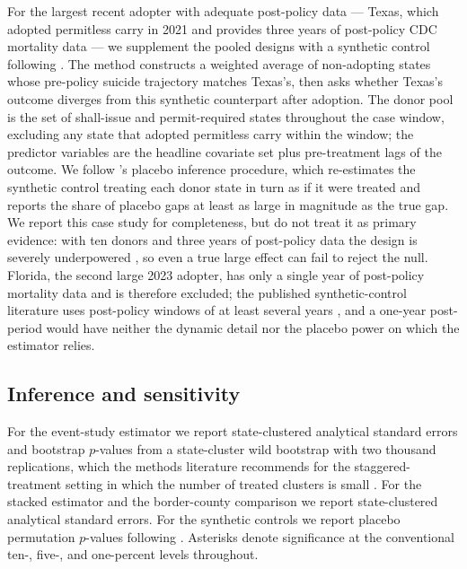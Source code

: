 \documentclass[12pt]{article}
\begin{document}
For the largest recent adopter with adequate post-policy data ---
Texas, which adopted permitless carry in 2021 and provides three
years of post-policy CDC mortality data --- we supplement the
pooled designs with a synthetic control following
\citet{abadie2010}. The method constructs a weighted average of
non-adopting states whose pre-policy suicide trajectory matches
Texas's, then asks whether Texas's outcome diverges from this
synthetic counterpart after adoption. The donor pool is the set of
shall-issue and permit-required states throughout the case window,
excluding any state that adopted permitless carry within the
window; the predictor variables are the headline covariate set
plus pre-treatment lags of the outcome. We follow
\citet{abadie2021}'s placebo inference procedure, which
re-estimates the synthetic control treating each donor state in
turn as if it were treated and reports the share of placebo gaps
at least as large in magnitude as the true gap. We report this
case study for completeness, but do not treat it as primary
evidence: with ten donors and three years of post-policy data the
design is severely underpowered \citep{abadie2010}, so even a true
large effect can fail to reject the null. Florida, the second
large 2023 adopter, has only a single year of post-policy
mortality data and is therefore excluded; the published
synthetic-control literature uses post-policy windows of at least
several years \citep{abadie2010, donohue2019, crifasi2015,
rudolph2015, mccourt2020}, and a one-year post-period would have
neither the dynamic detail nor the placebo power on which the
estimator relies.

\subsection{Inference and sensitivity}\label{sec:inference}

For the event-study estimator we report state-clustered analytical
standard errors and bootstrap $p$-values from a state-cluster wild
bootstrap with two thousand replications, which the methods
literature recommends for the staggered-treatment setting in which
the number of treated clusters is small \citep{callaway2021}. For
the stacked estimator and the border-county comparison we report
state-clustered analytical standard errors. For the synthetic
controls we report placebo permutation $p$-values following
\citet{abadie2010}. Asterisks denote significance at the
conventional ten-, five-, and one-percent levels throughout.
\end{document}
